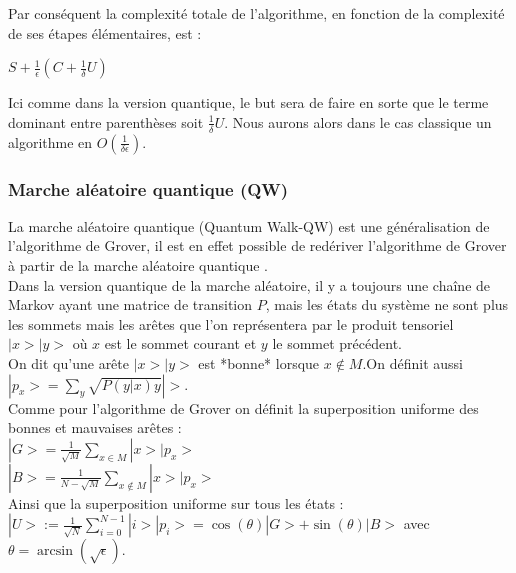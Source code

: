 \documentclass[12pt,openany]{report}
\begin{document}
\vspace{0.5cm}

Par conséquent la complexité totale de l’algorithme, en fonction de la complexité de ses étapes élémentaires, est :
\begin{center}


\begin{boxedminipage}[ poslb ]{4cm}
\begin{center}
{\Large
$\mathit{S} + \frac{1}{\epsilon}(C + \frac{1}{\delta}U)$
}
\end{center}
\end{boxedminipage}
\end{center}
Ici comme dans la version quantique, le but sera de faire en sorte que le terme
dominant entre parenthèses soit $\frac{1}{\delta}U$. Nous aurons alors dans le cas classique un
algorithme en $O(\frac{1}{\delta \epsilon})$.

\subsubsection{Marche aléatoire quantique (QW)}
La marche aléatoire quantique (Quantum Walk-QW) est une généralisation de l’algorithme de Grover, il est en effet possible de redériver l’algorithme de Grover à partir de la marche aléatoire quantique \cite{Ghazal}.\\
Dans la version quantique de la marche aléatoire, il y a toujours une chaîne de Markov ayant une matrice de transition $\mathit{P}$, mais les états du système ne sont
plus les sommets mais les arêtes que l’on représentera par le produit tensoriel
$|x>|y>$ où $x$ est le sommet courant et $y$ le sommet précédent.\\
On dit qu'une arête $|x>|y> $ est *bonne* lorsque $ x \notin M $.On définit aussi $|p_x>=\sum_{y}\sqrt{\mathit{P}(y|x)y}|>   $.\\
Comme pour l’algorithme de Grover on définit la superposition uniforme des bonnes et mauvaises arêtes :\\
$|G>=\frac{1}{\sqrt{M}}\sum_{x \in M} |x>|p_x>$\\
$|B>=\frac{1}{N-\sqrt{M}}\sum_{x \notin M} |x>|p_x>$\\

Ainsi que la superposition uniforme sur tous les états :\\
$|U>:=\frac{1}{\sqrt{N}}\sum_{i=0}^{N-1}|i>|p_i>= \cos(\theta)|G> + \sin(\theta)|B>$ avec $\theta=\arcsin(\sqrt{\epsilon})$.\\
\end{document}
